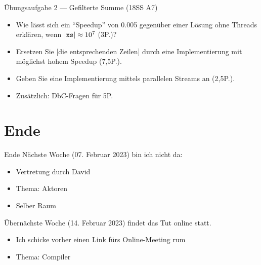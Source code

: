 \documentclass{beamer}
\begin{document}
\begin{frame}{Übungsaufgabe 2 --- Gefilterte Summe (18SS A7)}

	\begin{itemize}
		\item Wie lässt sich ein \enquote{Speedup} von 0.005 gegenüber einer Lösung ohne Threads erklären, wenn $|\textrm{\texttt{xs}}| \approx 10^7$ (3P.)?
		\item Ersetzen Sie [die entsprechenden Zeilen] durch eine Implementierung mit möglichst hohem Speedup (7,5P.).
		\item Geben Sie eine Implementierung mittels parallelen Streams an (2,5P.).
		\item Zusätzlich: DbC-Fragen für 5P.
	\end{itemize}
\end{frame}

\section{Ende}

\begin{frame}{Ende}
	Nächste Woche (07. Februar 2023) bin ich nicht da:

	\begin{itemize}
		\item Vertretung durch David
		\item Thema: Aktoren
		\item Selber Raum
	\end{itemize}

	Übernächste Woche (14. Februar 2023) findet das Tut online statt.

	\begin{itemize}
		\item Ich schicke vorher einen Link fürs Online-Meeting rum
		\item Thema: Compiler
	\end{itemize}
\end{frame}
\end{document}
